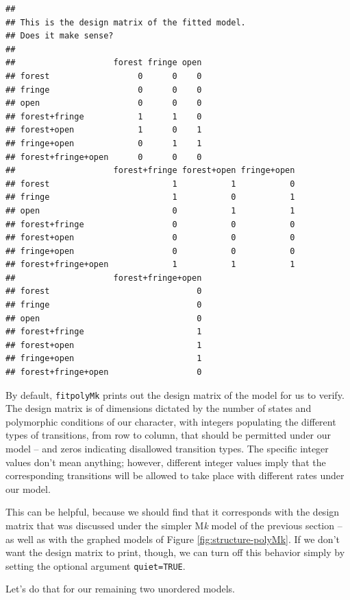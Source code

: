 \documentclass[fleqn,10pt,lineno]{wlpeerj} %
\begin{document}
\begin{verbatim}
## 
## This is the design matrix of the fitted model.
## Does it make sense?
## 
##                    forest fringe open
## forest                  0      0    0
## fringe                  0      0    0
## open                    0      0    0 
## forest+fringe           1      1    0
## forest+open             1      0    1
## fringe+open             0      1    1
## forest+fringe+open      0      0    0
##                    forest+fringe forest+open fringe+open
## forest                         1           1           0
## fringe                         1           0           1
## open                           0           1           1
## forest+fringe                  0           0           0
## forest+open                    0           0           0
## fringe+open                    0           0           0
## forest+fringe+open             1           1           1
##                    forest+fringe+open
## forest                              0
## fringe                              0
## open                                0
## forest+fringe                       1
## forest+open                         1
## fringe+open                         1
## forest+fringe+open                  0
\end{verbatim}

By default, \texttt{fitpolyMk} prints out the design matrix of the model for us to verify. The design matrix is of dimensions dictated by the number of states and polymorphic conditions of our character, with integers populating the different types of transitions, from row to column, that should be permitted under our model -- and zeros indicating disallowed transition types. The specific integer values don't mean anything; however, different integer values imply that the corresponding transitions will be allowed to take place with different rates under our model.

This can be helpful, because we should find that it corresponds with the design matrix that was discussed under the simpler M\emph{k} model of the previous section -- as well as with the graphed models of Figure \ref{fig:structure-polyMk}. If we don't want the design matrix to print, though, we can turn off this behavior simply by setting the optional argument \texttt{quiet=TRUE}.

Let's do that for our remaining two unordered models.
\end{document}
